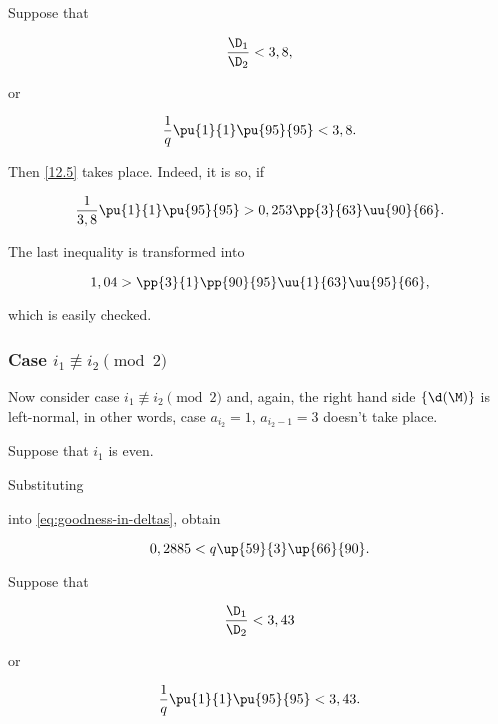 Suppose that

\begin{equation}\label{goodness_condition_3,8}
	\dfrac{\D_1}{\D_2} < 3,8,
\end{equation}

or

\begin{equation*}
	\dfrac{1}{q} \pu{1}{1} \pu{95}{95}
	<
	3,8.
\end{equation*}

Then \ref{12.5} takes place. Indeed, it is so, if

\begin{equation*}
	\dfrac{1}{3,8} \pu{1}{1} \pu{95}{95}
	>
	0,253 \pp{3}{63} \uu{90}{66}.
\end{equation*}

The last inequality is transformed into

\begin{equation*}
	1,04
	>
	\pp{3}{1} \pp{90}{95} \uu{1}{63} \uu{95}{66},
\end{equation*}

which is easily checked.

\subsubsection{Case $i_1 \not\equiv i_2 \pmod 2$}

Now consider case $i_1 \not\equiv i_2 \pmod 2$
and, again, the right hand side $\{\d(\M)\}$ is left-normal,
in other words, case $a_{i_2} = 1$, $a_{i_2 - 1} = 3$
doesn't take place.

Suppose that $i_1$ is even.


Substituting

into \ref{eq:goodness-in-deltas}, obtain

\begin{equation}\label{12.9}
	0,2885
	<
	q \up{59}{3} \up{66}{90}.
\end{equation}

Suppose that

\begin{equation}\label{eq:goodness-condition-3,43}
	\dfrac{\D_1}{\D_2} < 3,43
\end{equation}

or

\begin{equation*}
	\dfrac{1}{q} \pu{1}{1} \pu{95}{95}
	<
	3,43.
\end{equation*}

